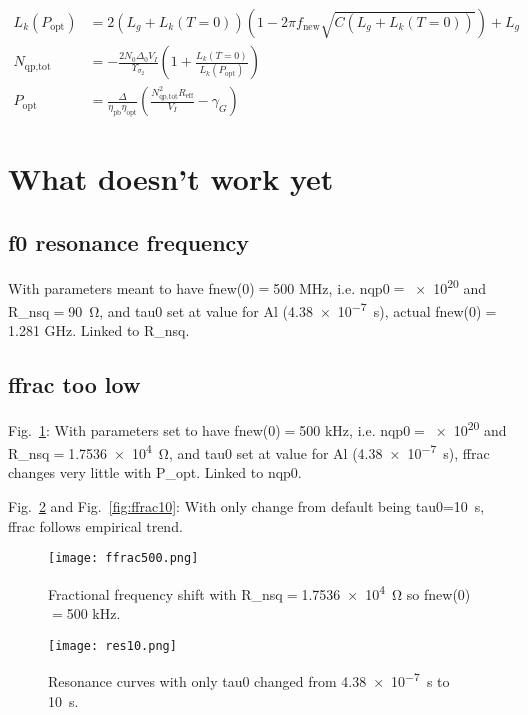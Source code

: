 \documentclass[12pt]{article}
\begin{document}
\begin{align*}
L_k(P_\text{opt}) &= 2(L_g +L_k(T=0))(1 -2\pi f_\text{new}\sqrt{C(L_g +L_k(T=0))}) +L_g\\
N_\text{qp,tot} &= -\frac{2N_0\Delta_0 V_I}{\Upsilon_{\sigma_2}}\left(1 +\frac{L_k(T=0)}{L_k(P_\text{opt})}\right)\\
P_\text{opt} &= \frac{\Delta}{\eta_\text{pb}\eta_\text{opt}}\left(\frac{N_\text{qp,tot}^2 R_\text{eff}}{V_I} -\gamma_G\right)
\end{align*}

\section{What doesn't work yet}
\subsection{f0 resonance frequency}
With parameters meant to have fnew(0)$=$500 MHz, i.e. nqp0$=$\num{e20} and R\_nsq$=$\SI{90}{\ohm}, and tau0 set at value for Al (\SI{4.38e-7}{s}), actual fnew(0)$=$1.281 GHz. Linked to R\_nsq.

\subsection{ffrac too low}
Fig.~\ref{fig:ffrac500}: With parameters set to have fnew(0)$=$500 kHz, i.e. nqp0$=$\num{e20} and R\_nsq$=$\SI{1.7536e4}{\ohm}, and tau0 set at value for Al (\SI{4.38e-7}{s}), ffrac changes very little with P\_opt. Linked to nqp0.

Fig.~\ref{fig:res10} and Fig.~\ref{fig:ffrac10}: With only change from default being tau0=\SI{10}{s}, ffrac follows empirical trend.

\begin{figure}[htbp]
\begin{center}
\texttt{[image: ffrac500.png]}
\caption{Fractional frequency shift with R\_nsq$=$\SI{1.7536e4}{\ohm} so fnew(0)$=$500 kHz.}
\label{fig:ffrac500}
\end{center}
\end{figure}

\begin{figure}[htbp]
\begin{center}
\texttt{[image: res10.png]}
\caption{Resonance curves with only tau0 changed from \SI{4.38e-7}{s} to \SI{10}{s}.}
\label{fig:res10}
\end{center}
\end{figure}
\end{document}

